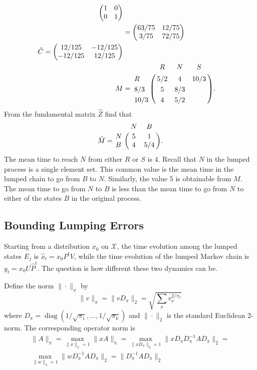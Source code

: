 \documentclass[12pt]{article}
\begin{document}
\begin{example}
\begin{align*}
\begin{pmatrix}
            1 & 0 \\
            0 & 1
        \end{pmatrix}
        \\
        & =
        \begin{pmatrix}
            63/75 & 12/75 \\
            3/75 & 72/75
        \end{pmatrix}
        \\
        \hat{C} =
        \begin{pmatrix}
            12/125 & -12/125 \\
            -12/125 & 12/125
        \end{pmatrix}
        \\
        M &= \bordermatrix{ & R & N & S \cr
        R & 5/2 & 4 & 10/3 \cr
        8/3 & 5 & 8/3 \cr
        10/3 & 4 & 5/2}.
    \end{align*}
    From the fundamental matrix \( \hat{Z} \) find that
    \[
        \hat{M} = \bordermatrix{ & N & B \cr
        N & 5 & 1 \cr
        B & 4 & 5/4 }.
    \] The mean time to reach \( N \) from either \( R \) or \( S \) is \(
    4 \).  Recall that \( N \) in the lumped process is a single element
    set.  This common value is the mean time in the lumped chain to go
    from \( B \) to \( N \).  Similarly, the value \( 5 \) is obtainable
    from \( M \).  The mean time to go from \( N \) to \( B \) is less
    than the mean time to go from \( N \) to either of the states \( B \)
    in the original process.
\end{example}

\subsection*{Bounding Lumping Errors}

Starting from a distribution \( x_0 \) on \( \mathcal{X} \), the time
evolution among the lumped states \( E_j \) is \( \hat{x}_{t} = x_0 P^t
V \), while the time evolution of the lumped Markov chain is \( y_t = x_0U
\hat{P}^t \).  The question is how different these two dynamics can be.

Define the norm \( \| \cdot \|_{\pi} \) by
\[
    \| v\|_{\pi} = \| v D_{\pi} \|_2 = \sqrt{\sum_{\nu} v_{\nu}^{2/\pi_\nu}}
\] where \( D_{\pi} =
\operatorname{diag}
(1/\sqrt{\pi_1}, \dots, 1/\sqrt{\pi_k}) \) and \( \| \cdot \|_2 \) is
the standard Euclidean \( 2 \)-norm.  The corresponding operator norm is
\begin{multline*}
    \| A \|_{\pi} = \max_{\|x\|_{\pi}=1}\|xA\|_{\pi} = \max_{\|xD_{\pi}\|_2
    = 1}\|x D_{\pi} D_{\pi}^{-1} A D_{\pi}\|_{2} = \\
    \max_{\|w\|_2 = 1}\|w D_{\pi}^{-1} A D_{\pi}\|_{2} = \| D_{\pi}^{-1}
    A D_{\pi}\|_{2}
\end{multline*}
\end{document}
